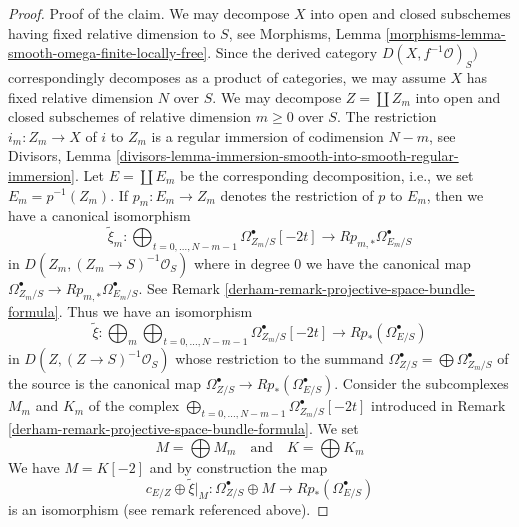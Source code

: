 \begin{proof}
\medskip\noindent
Proof of the claim. We may decompose $X$ into open and closed subschemes
having fixed relative dimension to $S$, see
Morphisms, Lemma \ref{morphisms-lemma-smooth-omega-finite-locally-free}.
Since the derived category $D(X, f^{-1}\mathcal{O})_S)$ correspondingly
decomposes as a product of categories, we may assume $X$ has
fixed relative dimension $N$ over $S$. We may decompose
$Z = \coprod Z_m$ into open and closed subschemes of relative
dimension $m \geq 0$ over $S$. The restriction $i_m : Z_m \to X$ of
$i$ to $Z_m$ is a regular immersion of codimension $N - m$, see Divisors, Lemma
\ref{divisors-lemma-immersion-smooth-into-smooth-regular-immersion}.
Let $E = \coprod E_m$ be the corresponding decomposition, i.e.,
we set $E_m = p^{-1}(Z_m)$. If $p_m : E_m \to Z_m$ denotes the
restriction of $p$ to $E_m$, then we have a canonical isomorphism
$$
\tilde \xi_m :
\bigoplus\nolimits_{t = 0, \ldots, N - m - 1}
\Omega^\bullet_{Z_m/S}[-2t]
\longrightarrow
Rp_{m, *}\Omega^\bullet_{E_m/S}
$$
in $D(Z_m, (Z_m \to S)^{-1}\mathcal{O}_S)$
where in degree $0$ we have the canonical map
$\Omega^\bullet_{Z_m/S} \to Rp_{m, *}\Omega^\bullet_{E_m/S}$.
See Remark \ref{derham-remark-projective-space-bundle-formula}.
Thus we have an isomorphism
$$
\tilde \xi :
\bigoplus\nolimits_m
\bigoplus\nolimits_{t = 0, \ldots, N - m - 1}
\Omega^\bullet_{Z_m/S}[-2t]
\longrightarrow
Rp_*(\Omega^\bullet_{E/S})
$$
in $D(Z, (Z \to S)^{-1}\mathcal{O}_S)$
whose restriction to the summand
$\Omega^\bullet_{Z/S} = \bigoplus \Omega^\bullet_{Z_m/S}$ of the source
is the canonical map $\Omega^\bullet_{Z/S} \to Rp_*(\Omega^\bullet_{E/S})$.
Consider the subcomplexes $M_m$ and $K_m$ of the complex
$\bigoplus\nolimits_{t = 0, \ldots, N - m - 1} \Omega^\bullet_{Z_m/S}[-2t]$
introduced in Remark \ref{derham-remark-projective-space-bundle-formula}.
We set
$$
M = \bigoplus M_m
\quad\text{and}\quad
K = \bigoplus K_m
$$
We have $M = K[-2]$ and by construction the map
$$
c_{E/Z} \oplus \tilde \xi|_M :
\Omega^\bullet_{Z/S} \oplus M
\longrightarrow
Rp_*(\Omega^\bullet_{E/S})
$$
is an isomorphism (see remark referenced above).


\end{proof}
